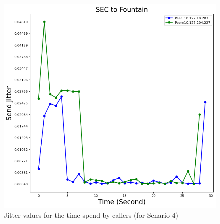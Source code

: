 	\begin{figure}[!t]
		\begin{minipage}{\textwidth}
			\includegraphics[scale=0.38]{Images/experiment/senarios/df_fountain.png}
		\end{minipage}
		\caption{Jitter values for the time spend by callers (for Senario 4)}
		\label{fig:scene-out-4}
	\end{figure}


